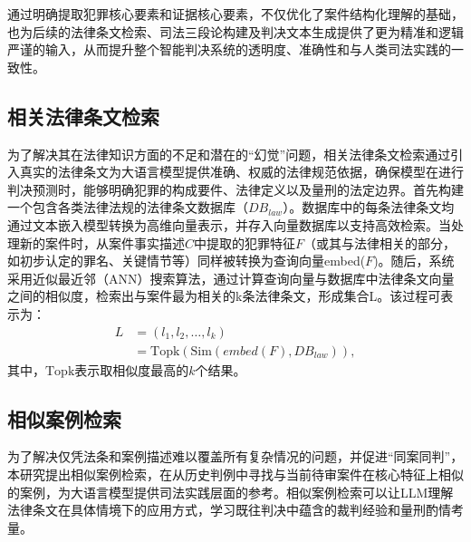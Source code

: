 通过明确提取犯罪核心要素和证据核心要素，不仅优化了案件结构化理解的基础，也为后续的法律条文检索、司法三段论构建及判决文本生成提供了更为精准和逻辑严谨的输入，从而提升整个智能判决系统的透明度、准确性和与人类司法实践的一致性。
\subsection{\heiti 相关法律条文检索}
为了解决其在法律知识方面的不足和潜在的“幻觉”问题，相关法律条文检索通过引入真实的法律条文为大语言模型提供准确、权威的法律规范依据，确保模型在进行判决预测时，能够明确犯罪的构成要件、法律定义以及量刑的法定边界。首先构建一个包含各类法律法规的法律条文数据库（$DB_{law}$​）。数据库中的每条法律条文均通过文本嵌入模型转换为高维向量表示，并存入向量数据库以支持高效检索。当处理新的案件时，从案件事实描述$C$中提取的犯罪特征$F$（或其与法律相关的部分，如初步认定的罪名、关键情节等）同样被转换为查询向量embed($F$)。随后，系统采用近似最近邻（ANN）搜索算法，通过计算查询向量与数据库中法律条文向量之间的相似度，检索出与案件最为相关的k条法律条文，形成集合L。该过程可表示为：
\begin{equation}
	\begin{aligned}
		L & =(l_1​,l_2​,\dots,l_k​)                       \\
		  & =\text{Topk}​(\text{Sim}(embed(F),DB_{law})),
	\end{aligned}
\end{equation}
其中，$\text{Topk}​$表示取相似度最高的$k$个结果。
\subsection{\heiti 相似案例检索}
为了解决仅凭法条和案例描述难以覆盖所有复杂情况的问题，并促进“同案同判”， 本研究提出相似案例检索，在从历史判例中寻找与当前待审案件在核心特征上相似的案例，为大语言模型提供司法实践层面的参考。相似案例检索可以让LLM理解法律条文在具体情境下的应用方式，学习既往判决中蕴含的裁判经验和量刑酌情考量。

